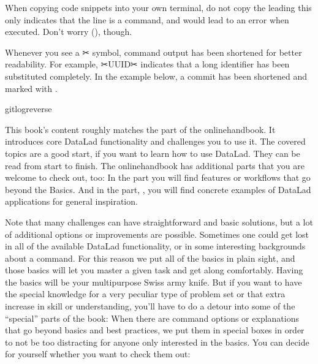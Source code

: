 \sphinxAtStartPar
When copying code snippets into your own terminal, do not copy the leading
\sphinxcode{\sphinxupquote{\$}} \textemdash{} this only indicates that the line is a command, and would lead to an
error when executed.
Don’t worry {\hyperref[\detokenize{intro/narrative:fom-lazy}]{}} (), though.

\sphinxAtStartPar
Whenever you see a ✂ symbol, command output has been shortened for better readability.
For example, ✂UUID✂ indicates that a long {\hyperref[\detokenize{glossary:UUID}]{}} identifier has been substituted completely.
In the example below, a commit {\hyperref[\detokenize{glossary:term-shasum}]{}} has been shortened and marked with .

\begin{sphinxVerbatim}[commandchars=\\\{\}]
gitlog\PYGZhy{}\PYGZhy{}reverse
\end{sphinxVerbatim}

\sphinxAtStartPar
This book’s content roughly matches the  part of the online\sphinxhyphen{}handbook.
It introduces core DataLad functionality and challenges you to use it.
The covered topics are a good start, if you want to learn how to use DataLad.
They can be read from start to finish.
The online\sphinxhyphen{}handbook has additional parts that you are welcome to check
out, too:
In the  part you will find features or workflows that go beyond the
Basics.
And in the part, , you will find concrete examples of
DataLad applications for general inspiration.

\sphinxAtStartPar
Note that many challenges can have straightforward and basic solutions,
but a lot of additional options or improvements are possible.
Sometimes one could get lost in all of the available DataLad functionality,
or in some interesting backgrounds about a command.
For this reason we put all of the basics in plain sight, and those basics
will let you master a given task and get along comfortably.
Having the basics will be your multi\sphinxhyphen{}purpose Swiss army knife.
But if you want to have the special knowledge for a very peculiar type
of problem set or that extra increase in skill or understanding,
you’ll have to do a detour into some of the “special” parts of the book:
When there are command options or explanations that go beyond basics and
best practices, we put them in special boxes in order
to not be too distracting for anyone only interested in the basics.
You can decide for yourself whether you want to check them out:

